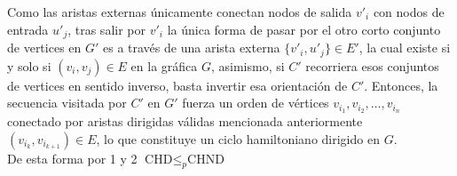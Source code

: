 \begin{enumerate}
                Como las aristas externas únicamente conectan nodos de salida $v'_i$ con nodos de entrada $u'_j$, tras salir por $v'_i$ la única forma de pasar por el otro corto conjunto de vertices en $G'$ es a través de una arista externa $\{v'_i, u'_j\} \in E'$, la cual existe si y solo si $(v_i, v_j) \in E$ en la gráfica $G$, asimismo, si $C'$ recorriera esos conjuntos de vertices en sentido inverso, basta invertir esa orientación de $C'$. Entonces, la secuencia visitada por $C'$ en $G'$ fuerza un orden de vértices $v_{i_1}, v_{i_2}, \dots, v_{i_n}$ conectado por aristas dirigidas válidas mencionada anteriormente $(v_{i_k}, v_{i_{k+1}}) \in E$, lo que constituye un ciclo hamiltoniano dirigido en $G$.\cite{sipser2013introduction}\\

        De esta forma por 1 y 2 $\text{CHD} \le_p \text{CHND}$
    \end{enumerate}
